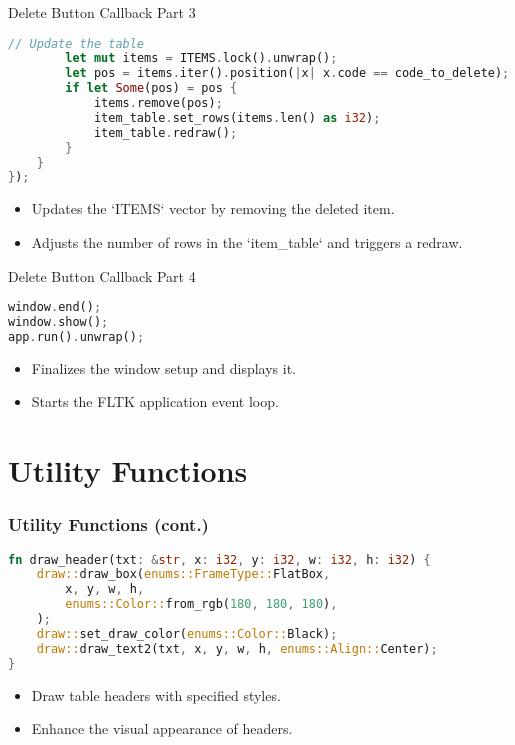 \documentclass[aspectratio=169, table]{beamer}
\begin{document}
\begin{frame}[fragile]{Delete Button Callback Part 3}
	\begin{lstlisting}[language=Rust]
		// Update the table
		let mut items = ITEMS.lock().unwrap();
		let pos = items.iter().position(|x| x.code == code_to_delete);
		if let Some(pos) = pos {
			items.remove(pos);
			item_table.set_rows(items.len() as i32);
			item_table.redraw();
		}
	}
});
\end{lstlisting}

\begin{itemize}
\item Updates the `ITEMS` vector by removing the deleted item.
\item Adjusts the number of rows in the `item\_table` and triggers a redraw.
\end{itemize}
\end{frame}

\begin{frame}[fragile]{Delete Button Callback Part 4}
\begin{lstlisting}[language=Rust]
window.end();
window.show();
app.run().unwrap();
\end{lstlisting}

\begin{itemize}
\item Finalizes the window setup and displays it.
\item Starts the FLTK application event loop.
\end{itemize}
\end{frame}

\section{Utility Functions}
\begin{frame}[fragile]
\frametitle{Utility Functions (cont.)}
\begin{lstlisting}[language=Rust]
fn draw_header(txt: &str, x: i32, y: i32, w: i32, h: i32) {
	draw::draw_box(enums::FrameType::FlatBox, 
		x, y, w, h,
		enums::Color::from_rgb(180, 180, 180), 
	);
	draw::set_draw_color(enums::Color::Black);
	draw::draw_text2(txt, x, y, w, h, enums::Align::Center);
}
\end{lstlisting}
\begin{itemize}
\item Draw table headers with specified styles.
\item Enhance the visual appearance of headers.
\end{itemize}
\end{frame}
\end{document}
